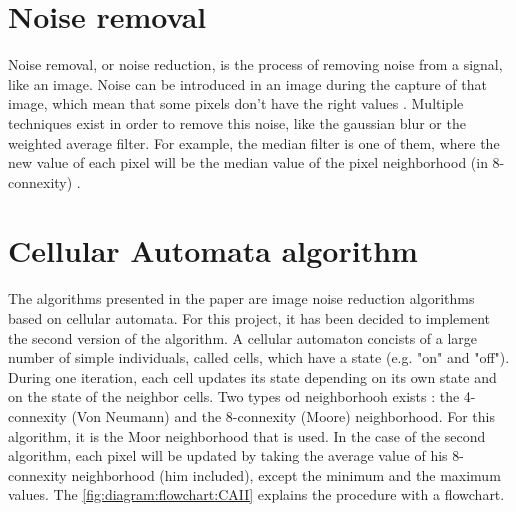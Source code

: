 \noindent\begin{minipage}{0.55\textwidth}


\section{Noise removal}


Noise removal, or noise reduction, is the process of removing noise from a signal, like an image. Noise can be introduced in an image during the capture of that image, which mean that some pixels don't have the right values \cite{bib:noise:wikipedia}. Multiple techniques exist in order to remove this noise, like the gaussian blur or the weighted average filter. For example, the median filter is one of them, where the new value of each pixel will be the median value of the pixel neighborhood (in 8-connexity) \cite{bib:noise:ImageFiltering}.


\section{Cellular Automata algorithm}

The algorithms presented in the paper \cite{bib:filter:CA} are image noise reduction algorithms based on cellular automata. For this project, it has been decided to implement the second version of the algorithm. A cellular automaton concists of a large number of simple individuals, called cells, which have a state (e.g. "on" and "off"). During one iteration, each cell updates its state depending on its own state and on the state of the neighbor cells. Two types od neighborhooh exists : the 4-connexity (Von Neumann) and the 8-connexity (Moore) neighborhood. For this algorithm, it is the Moor neighborhood that is used. In the case of the second algorithm, each pixel will be updated by taking the average value of his 8-connexity neighborhood (him included), except the minimum and the maximum values. The \vref{fig:diagram:flowchart:CAII} explains the procedure with a flowchart.


\end{minipage} \hfill 
